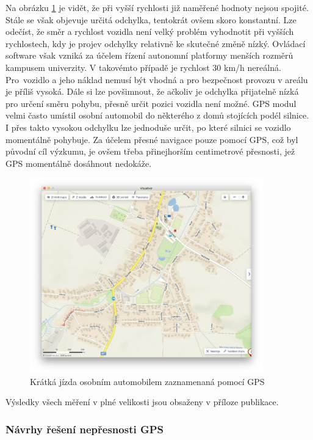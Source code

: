 \documentclass[czech, bachelor]{diploma}
\begin{document}
Na obrázku \ref{fig:olsinaautem} je vidět, že při vyšší rychlosti již naměřené hodnoty nejsou spojité. Stále se však objevuje
určitá odchylka, tentokrát ovšem skoro konstantní. Lze odečíst, že směr a rychlost vozidla není velký problém vyhodnotit při
vyšších rychlostech, kdy je projev odchylky relativně ke skutečné změně nízký. Ovládací software však vzniká za účelem řízení
autonomní platformy menších rozměrů kampusem univerzity. V takovémto případě je rychlost 30 km/h nereálná. Pro~vozidlo a jeho
náklad nemusí být vhodná a pro bezpečnost provozu v areálu je příliš vysoká. Dále si lze povšimnout, že ačkoliv je odchylka
přijatelně nízká pro určení směru pohybu, přesně určit pozici vozidla není možné. GPS modul velmi často umístil osobní automobil
do některého z domů stojících podél silnice. I přes takto vysokou odchylku lze jednoduše určit, po které silnici se vozidlo
momentálně pohybuje. Za účelem přesné navigace pouze pomocí GPS, což byl původní cíl výzkumu, je ovšem třeba přinejhorším
centimetrové přesnosti, jež GPS momentálně dosáhnout nedokáže.

\begin{figure}
    \centering
    \includegraphics[width=0.9\textwidth]{Figures/olsinaautem.png}
    \caption{Krátká jízda osobním automobilem zaznamenaná pomocí GPS}
    \label{fig:olsinaautem}
\end{figure}

Výsledky všech měření v plné velikosti jsou obsaženy v příloze publikace.

\subsubsection{Návrhy řešení nepřesnosti GPS}
\end{document}
